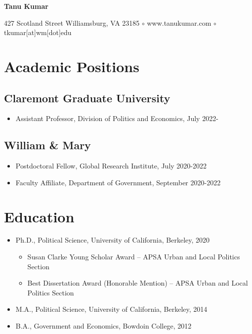 \documentclass[11pt]{article}
\begin{document}
\begin{center}
\color{MidnightBlue}

{\huge\textbf{Tanu Kumar}}
\color{Black}


\vspace{1mm}

427 Scotland Street Williamsburg, VA 23185  \color{MidnightBlue}
 $\circ$ \color{Black}
	 www.tanukumar.com \color{MidnightBlue}
$\circ$ \color{Black}tkumar[at]wm[dot]edu

\noindent \hrulefill
\end{center}
\color{MidnightBlue}
\section*{Academic Positions}
\color{Black}

\subsection*{Claremont Graduate University}
	\begin{itemize}[nosep]
		\item[] Assistant Professor, Division of Politics and Economics, July 2022-	


	
\end{itemize}	
\subsection*{William \& Mary}
	\begin{itemize}[nosep]
		\item[] Postdoctoral Fellow, Global Research Institute, July 2020-2022
		\item[]Faculty Affiliate, Department of Government, September 2020-2022
	


	
\end{itemize}

	

\vspace{2mm}
\color{MidnightBlue}

\section*{Education}
\color{Black}
	\begin{itemize}[nosep]
		\item[]Ph.D., Political Science, University of California, Berkeley, 2020
\begin{itemize}[nosep]
	\item Susan Clarke Young Scholar Award -- APSA Urban and Local Politics Section	\item Best Dissertation Award (Honorable Mention) --  APSA Urban and Local Politics Section

\end{itemize}

	\item[]M.A., Political Science, University of California, Berkeley, 2014
	\item[]B.A., Government and Economics, Bowdoin College, 2012

\end{itemize}
\end{document}
